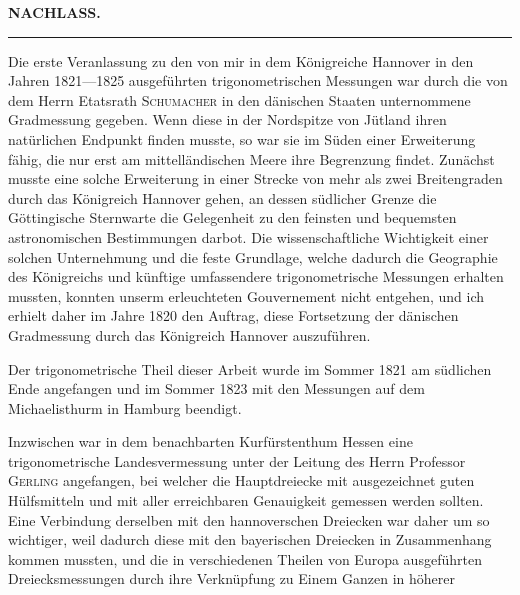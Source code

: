 \clearpage
\noindent{}\hfill{\small\textbf{NACHLASS.}}\hfill\null\par
\vspace{2.5\baselineskip}
\begin{center}
{\large{}}\par\medskip
\rule{.12\linewidth}{.4pt}\par\medskip
{\large{}}
\end{center}

\par\noindent\hspace*{\parindent}Die erste Veranlassung zu den von mir in dem Königreiche Hannover
in den Jahren 1821---1825 ausgeführten trigonometrischen Messungen war
durch die von dem Herrn Etatsrath \textsc{Schumacher} in den dänischen Staaten
unternommene Gradmessung gegeben. Wenn diese in der Nordspitze von
Jütland ihren natürlichen Endpunkt finden musste, so war sie im Süden einer
Erweiterung fähig, die nur erst am mittelländischen Meere ihre Begrenzung
findet. Zunächst musste eine solche Erweiterung in einer Strecke von mehr
als zwei Breitengraden durch das Königreich Hannover gehen, an dessen südlicher
Grenze die Göttingische Sternwarte die Gelegenheit zu den feinsten
und bequemsten astronomischen Bestimmungen darbot. Die wissenschaftliche
Wichtigkeit einer solchen Unternehmung und die feste Grundlage, welche
dadurch die Geographie des Königreichs und künftige umfassendere trigonometrische
Messungen erhalten mussten, konnten unserm erleuchteten Gouvernement
nicht entgehen, und ich erhielt daher im Jahre 1820 den Auftrag,
diese Fortsetzung der dänischen Gradmessung durch das Königreich Hannover
auszuführen.

\par\noindent\hspace*{\parindent}Der trigonometrische Theil dieser Arbeit wurde im Sommer 1821 am
südlichen Ende angefangen und im Sommer 1823 mit den Messungen auf dem
Michaelisthurm in Hamburg beendigt.

\par\noindent\hspace*{\parindent}Inzwischen war in dem benachbarten Kurfürstenthum Hessen eine trigonometrische
Landesvermessung unter der Leitung des Herrn Professor \textsc{Gerling}
angefangen, bei welcher die Hauptdreiecke mit ausgezeichnet guten Hülfsmitteln
und mit aller erreichbaren Genauigkeit gemessen werden sollten. Eine Verbindung
derselben mit den hannoverschen Dreiecken war daher um so wichtiger,
weil dadurch diese mit den bayerischen Dreiecken in Zusammenhang
kommen mussten, und die in verschiedenen Theilen von Europa ausgeführten
Dreiecksmessungen durch ihre Verknüpfung zu Einem Ganzen in höherer
\par\clearpage

